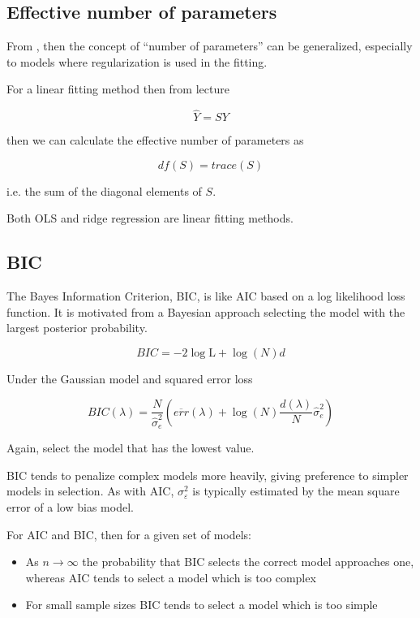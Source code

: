 \subsection{Effective number of parameters}

From \cite[p.~232]{friedman2016elements}, then the concept of “number of parameters” can be generalized, especially to models where regularization is used in the fitting.

For a linear fitting method then from lecture \cite[p.~41]{lecture2}

\[
    \hat{Y} = SY
\]

then we can calculate the effective number of parameters as

\[
    df(S) = trace(S)
\]

i.e. the sum of the diagonal elements of $S$.

Both OLS and ridge regression are linear fitting methods.



\subsection{BIC}

The Bayes Information Criterion, BIC, is like AIC based on a log
likelihood loss function. It is motivated from a Bayesian approach
selecting the model with the largest posterior probability. \cite[p.~42]{lecture2}

\[
    BIC = -2 \log \text{L} + \log(N) d
\]

Under the Gaussian model and squared error loss

\[
    BIC(\lambda) = \frac{N}{\hat{\sigma}^2_e} \left(
    \overline{err} (\lambda) + \log (N) \frac{d(\lambda)}{N} \hat{\sigma}^2_e \right)
\]

Again, select the model that has the lowest value.

BIC tends to penalize complex models more heavily, giving preference to simpler models in selection. As with AIC, $\sigma^2_\varepsilon$ is typically estimated by the mean square error of a low bias model. \cite[p.~233]{friedman2016elements}


For AIC and BIC, then for a given set of models:

\begin{itemize}
  \item As $n \rightarrow \infty$ the probability that BIC selects the correct model approaches one, whereas AIC tends to select a model which is too complex
  \item For small sample sizes BIC tends to select a model which is too simple
\end{itemize}

